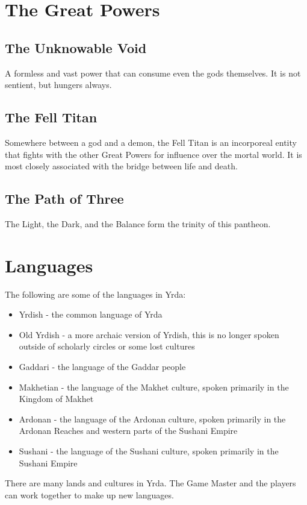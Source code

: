 \begin{multicols}{2}
\section{The Great Powers}

\subsection{The Unknowable Void}

A formless and vast power that can consume even the gods themselves. It
is not sentient, but hungers always.

\subsection{The Fell Titan}

Somewhere between a god and a demon, the Fell Titan is an incorporeal
entity that fights with the other Great Powers for influence over the
mortal world. It is most closely associated with the bridge between life
and death.

\subsection{The Path of Three}

The Light, the Dark, and the Balance form the trinity of this pantheon.

\section{Languages}

The following are some of the languages in Yrda:

\begin{itemize}
  \item Yrdish - the common language of Yrda
  \item Old Yrdish - a more archaic version of Yrdish, this is no longer spoken
    outside of scholarly circles or some lost cultures
  \item Gaddari - the language of the Gaddar people
  \item Makhetian - the language of the Makhet culture, spoken primarily in the
    Kingdom of Makhet
  \item Ardonan - the language of the Ardonan culture, spoken primarily in the
    Ardonan Reaches and western parts of the Sushani Empire
  \item Sushani - the language of the Sushani culture, spoken primarily in the
    Sushani Empire
\end{itemize}

There are many lands and cultures in Yrda. The Game Master and the players can work
together to make up new languages.

\end{multicols}
